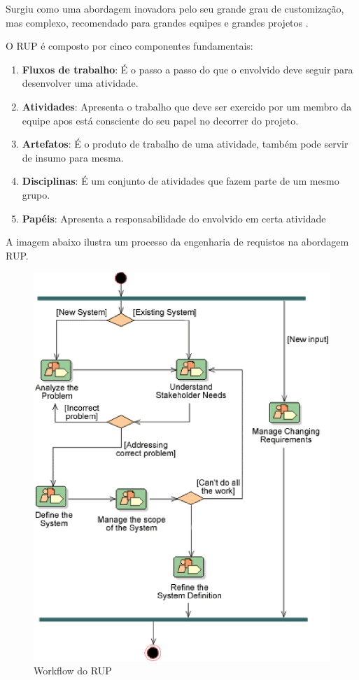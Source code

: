 Surgiu como uma abordagem inovadora pelo seu grande grau de customização, mas complexo,
recomendado para grandes equipes e grandes projetos \cite{KRUCHTEN}.

O RUP é composto por cinco componentes fundamentais:

\begin{enumerate}
  \item \textbf{Fluxos de trabalho}: É o passo a passo do que o envolvido deve seguir para
  desenvolver uma atividade.
  \item \textbf{Atividades}: Apresenta o trabalho que deve ser exercido por um membro da equipe
  apos está consciente do seu papel no decorrer do projeto.
  \item \textbf{Artefatos}: É o produto de trabalho de uma atividade, também pode servir de insumo para mesma.
  \item \textbf{Disciplinas}: É um conjunto de atividades que fazem parte de um mesmo grupo.
  \item \textbf{Papéis}: Apresenta a responsabilidade do envolvido em certa atividade
\end{enumerate}

A imagem abaixo ilustra um processo da engenharia de requistos na abordagem RUP.

\begin{figure}[H]
    \centering
  \includegraphics[keepaspectratio=true,scale=0.6]{figuras/WorkFlow_RUP_Requisitos.eps}
    \caption{Workflow do RUP}
    \label{fig:rup}
\end{figure}

